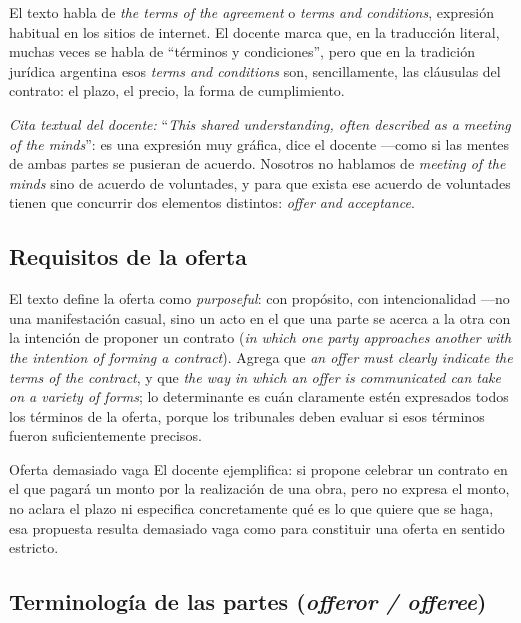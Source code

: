 \documentclass[12pt,oneside]{book}
\begin{document}
El texto habla de \textit{the terms of the agreement} o \textit{terms and conditions}, expresión habitual en los sitios de internet. El docente marca que, en la traducción literal, muchas veces se habla de ``términos y condiciones'', pero que en la tradición jurídica argentina esos \textit{terms and conditions} son, sencillamente, las cláusulas del contrato: el plazo, el precio, la forma de cumplimiento.

\begin{note}
\textit{Cita textual del docente:} ``\textit{This shared understanding, often described as a meeting of the minds}'': es una expresión muy gráfica, dice el docente —como si las mentes de ambas partes se pusieran de acuerdo. Nosotros no hablamos de \textit{meeting of the minds} sino de acuerdo de voluntades, y para que exista ese acuerdo de voluntades tienen que concurrir dos elementos distintos: \textit{offer and acceptance}.
\end{note}

\subsection{Requisitos de la oferta}

El texto define la oferta como \textit{purposeful}: con propósito, con intencionalidad —no una manifestación casual, sino un acto en el que una parte se acerca a la otra con la intención de proponer un contrato (\textit{in which one party approaches another with the intention of forming a contract}). Agrega que \textit{an offer must clearly indicate the terms of the contract}, y que \textit{the way in which an offer is communicated can take on a variety of forms}; lo determinante es cuán claramente estén expresados todos los términos de la oferta, porque los tribunales deben evaluar si esos términos fueron suficientemente precisos.

\begin{example}{Oferta demasiado vaga}
El docente ejemplifica: si propone celebrar un contrato en el que pagará un monto por la realización de una obra, pero no expresa el monto, no aclara el plazo ni especifica concretamente qué es lo que quiere que se haga, esa propuesta resulta demasiado vaga como para constituir una oferta en sentido estricto.
\end{example}

\subsection{Terminología de las partes (\textit{offeror / offeree})}
\end{document}
